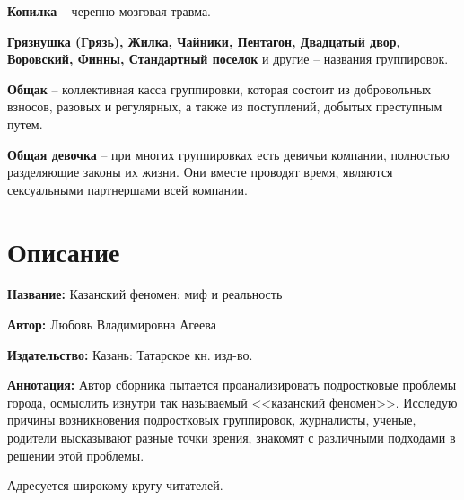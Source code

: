 \documentclass[12pt, a4paper, openany]{book}
\begin{document}
\textbf{Копилка} – черепно-мозговая травма.

\textbf{Грязнушка (Грязь), Жилка, Чайники, Пентагон, Двадцатый двор, Воровский, Финны, Стандартный поселок} и другие – названия группировок.

\textbf{Общак} – коллективная касса группировки, которая состоит из добровольных взносов, разовых и регулярных, а также из поступлений, добытых преступным путем.

\textbf{Общая девочка} – при многих группировках есть девичьи компании, полностью разделяющие законы их жизни. Они вместе проводят время, являются сексуальными партнершами всей компании.  	
	
	\newpage
	\tableofcontents
	
	\thispagestyle{empty} %
	
	\newpage
	
	\setcounter{secnumdepth}{0}
	
	
		\section*{Описание}
	
	{\bf Название:} Казанский феномен: миф и реальность
	
{\bf Автор:} Любовь Владимировна Агеева
	
{\bf Издательство:} Казань: Татарское кн. изд-во.
	
		{\bf Аннотация:} Автор сборника пытается проанализировать подростковые проблемы города, осмыслить изнутри так называемый <<казанский феномен>>. Исследую причины возникновения подростковых группировок, журналисты, ученые, родители высказывают разные точки зрения, знакомят с различными подходами в решении этой проблемы.
		
		Адресуется широкому кругу читателей.
		\thispagestyle{empty} %

	
\end{document}

